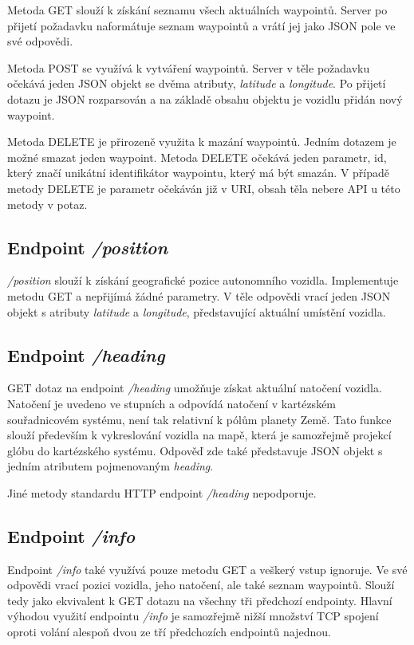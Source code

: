 \documentclass[czech, bachelor]{diploma}
\begin{document}
Metoda GET slouží k získání seznamu všech aktuálních waypointů. Server po přijetí požadavku naformátuje seznam waypointů a vrátí
jej jako JSON pole ve své odpovědi.

Metoda POST se využívá k vytváření waypointů. Server v těle požadavku očekává jeden JSON objekt se dvěma atributy, \emph{latitude}
a \emph{longitude}. Po přijetí dotazu je JSON rozparsován a na základě obsahu objektu je vozidlu přidán nový waypoint.

Metoda DELETE je přirozeně využita k mazání waypointů. Jedním dotazem je možné smazat jeden waypoint. Metoda DELETE očekává jeden
parametr, id, který značí unikátní identifikátor waypointu, který má být smazán. V případě metody DELETE je parametr očekáván již
v URI, obsah těla nebere API u této metody v potaz.

\subsection{Endpoint \emph{/position}}

\emph{/position} slouží k získání geografické pozice autonomního vozidla. Implementuje metodu GET a nepřijímá žádné parametry.
V těle odpovědi vrací jeden JSON objekt s atributy \emph{latitude} a \emph{longitude}, představující aktuální umístění vozidla.

\subsection{Endpoint \emph{/heading}}

GET dotaz na endpoint \emph{/heading} umožňuje získat aktuální natočení vozidla. Natočení je uvedeno ve stupních a odpovídá
natočení v kartézském souřadnicovém systému, není tak relativní k pólům planety Země. Tato funkce slouží především k vykreslování
vozidla na mapě, která je samozřejmě projekcí glóbu do kartézského systému. Odpověď zde také představuje JSON objekt s jedním
atributem pojmenovaným \emph{heading}.

Jiné metody standardu HTTP endpoint \emph{/heading} nepodporuje.

\subsection{Endpoint \emph{/info}}

Endpoint \emph{/info} také využívá pouze metodu GET a veškerý vstup ignoruje. Ve své odpovědi vrací pozici vozidla, jeho
natočení, ale také seznam waypointů. Slouží tedy jako ekvivalent k GET dotazu na všechny tři předchozí endpointy. Hlavní výhodou
využití endpointu \emph{/info} je samozřejmě nižší množství TCP spojení oproti volání alespoň dvou ze tří předchozích endpointů
najednou.
\end{document}
